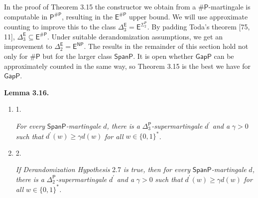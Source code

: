 In the proof of Theorem 3.15 the constructor we obtain from a ${\mathsf{\#}\mathsf{P}}$-martingale is computable in $\mathsf{P}^{\mathsf{\#}\mathsf{P}}$, resulting in the $\mathsf{E}^{\mathsf{\#}\mathsf{P}}$ upper bound. We will use approximate counting to improve this to the class $\Delta^{\mathsf{E}}_{3}=\mathsf{E}^{\Sigma^{\mathsf{P}}_{2}}$. By padding Toda’s theorem [75, 11], $\Delta^{\mathsf{E}}_{3}\subseteq\mathsf{E}^{\mathsf{\#}\mathsf{P}}$. Under suitable derandomization assumptions, we get an improvement to $\Delta^{\mathsf{E}}_{2}=\mathsf{E}^{\mathsf{NP}}$.
The results in the remainder of this section hold not only for ${\mathsf{\#}\mathsf{P}}$ but for the larger class $\mathsf{SpanP}$. It is open whether $\mathsf{GapP}$ can be approximately counted in the same way, so Theorem 3.15 is the best we have for $\mathsf{GapP}$.\par





\par\medskip\noindent\textbf{
\textbf{Lemma 3.16}\textbf{.}
}\par



\begin{enumerate}


\item[] 
1. 


\emph{For every }$\mathsf{SpanP}$\emph{-martingale }$d$\emph{, there is a }${\Delta^{\mathsf{P}}_{3}}$\emph{-supermartingale }$d^{\prime}$\emph{ and a }$\gamma>0$\emph{ such that }$d^{\prime}(w)\geq\gamma d(w)$\emph{ for all }$w\in\{0,1\}^{*}$\emph{.}\par





\item[] 
2. 


\emph{If Derandomization Hypothesis }2.7\emph{ is true, then for every }$\mathsf{SpanP}$\emph{-martingale }$d$\emph{, there is a }${\Delta^{\mathsf{P}}_{2}}$\emph{-supermartingale }$d^{\prime}$\emph{ and a }$\gamma>0$\emph{ such that }$d^{\prime}(w)\geq\gamma d(w)$\emph{ for all }$w\in\{0,1\}^{*}$\emph{.}\par





\end{enumerate}







